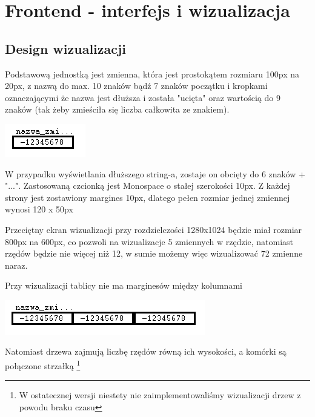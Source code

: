 \documentclass[a4paper,twoside,openright,11pt]{report}
\begin{document}
  \chapter{Frontend - interfejs i wizualizacja}
  
  \section {Design wizualizacji}
\par Podstawową jednostką jest zmienna, która jest prostokątem rozmiaru 100px na 20px, z nazwą do max. 10 znaków bądź 7 znaków początku i kropkami oznaczającymi że nazwa jest dłuższa i została "ucięta" oraz wartością do 9 znaków (tak żeby zmieściła się liczba całkowita ze znakiem). 

\begin{center}
  \includegraphics[scale=0.8]{wiz1}
\end{center}

\par W przypadku wyświetlania dłuższego string-a, zostaje on obcięty do 6 znaków + "...".
Zastosowaną czcionką jest Monospace o stałej szerokości 10px. Z każdej strony jest zostawiony margines 10px, dlatego pełen rozmiar jednej zmiennej wynosi 120 x 50px 
\par Przeciętny ekran wizualizacji przy rozdzielczości 1280x1024 będzie miał rozmiar 800px na 600px, co pozwoli na wizualizacje 5 zmiennych w rzędzie, natomiast rzędów będzie nie więcej niż 12, w sumie możemy więc wizualizować 72 zmienne naraz. 
\par Przy wizualizacji tablicy nie ma marginesów między kolumnami 

\begin{center}
  \includegraphics[scale=0.8]{wiz2}
\end{center}
	
\par Natomiast drzewa zajmują liczbę rzędów równą ich wysokości, a komórki są połączone strzałką \footnote{W ostatecznej wersji niestety nie zaimplementowaliśmy wizualizacji drzew z powodu braku czasu}
\end{document}

